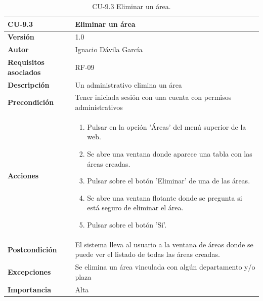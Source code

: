 \begin{table}[p]
	\centering
	\begin{tabularx}{\linewidth}{ p{} p{} }
		\toprule
		\textbf{CU-9.3}    & \textbf{Eliminar un área}\\
		\toprule
		\textbf{Versión}              & 1.0    \\
		\textbf{Autor}                & Ignacio Dávila García \\
		\textbf{Requisitos asociados} & RF-09 \\
		\textbf{Descripción}          & Un administrativo elimina un área \\
		\textbf{Precondición}         & Tener iniciada sesión con una cuenta con permisos administrativos \\
		\textbf{Acciones}             &
		\begin{enumerate}
			\def\labelenumi{\arabic{enumi}.}
			\tightlist
			\item Pulsar en la opción 'Áreas' del menú superior de la web.
			\item Se abre una ventana donde aparece una tabla con las áreas creadas.
			\item Pulsar sobre el botón 'Eliminar' de una de las áreas.
			\item Se abre una ventana flotante donde se pregunta si está seguro de eliminar el área.
			\item Pulsar sobre el botón 'Sí'.
		\end{enumerate}\\
		\textbf{Postcondición}        & El sistema lleva al usuario a la ventana de áreas donde se puede ver el listado de todas las áreas creadas. \\
		\textbf{Excepciones}          & Se elimina un área vinculada con algún departamento y/o plaza \\
		\textbf{Importancia}          & Alta \\
		\bottomrule
	\end{tabularx}
	\caption{CU-9.3 Eliminar un área.}
\end{table}

